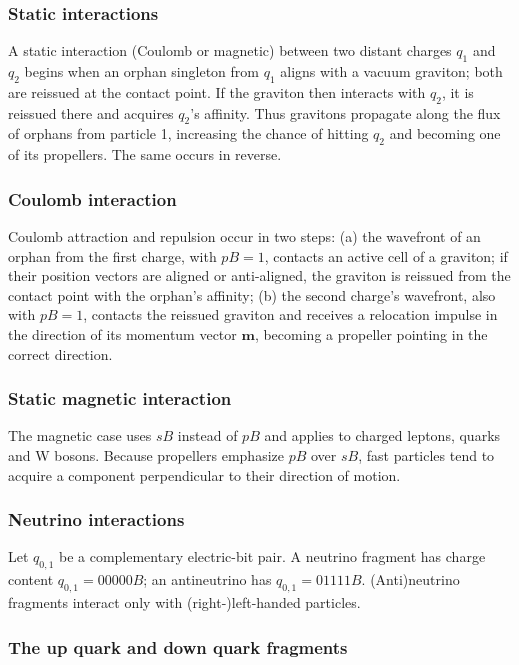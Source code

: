\documentclass{ijuc}
\begin{document}
\subsubsection{Static interactions}

A static interaction (Coulomb or magnetic) between two distant charges $q_1$ and $q_2$ begins when an orphan singleton from $q_1$ aligns with a vacuum graviton; both are reissued at the contact point. If the graviton then interacts with $q_2$, it is reissued there and acquires $q_2$'s affinity. Thus gravitons propagate along the flux of orphans from particle 1, increasing the chance of hitting $q_2$ and becoming one of its propellers. The same occurs in reverse.

\subsubsection{Coulomb interaction} \label{subsec:Coulomb-interaction}

Coulomb attraction and repulsion occur in two steps: (a) the wavefront of an orphan from the first charge, with $pB=1$, contacts an active cell of a graviton; if their position vectors are aligned or anti-aligned, the graviton is reissued from the contact point with the orphan's affinity; (b) the second charge's wavefront, also with $pB=1$, contacts the reissued graviton and receives a relocation impulse in the direction of its momentum vector $\boldsymbol{m}$, becoming a propeller pointing in the correct direction.

\subsubsection{Static magnetic interaction}

The magnetic case uses $sB$ instead of $pB$ and applies to charged leptons, quarks and W bosons. Because propellers emphasize $pB$ over $sB$, fast particles tend to acquire a component perpendicular to their direction of motion.

\subsubsection{Neutrino interactions}

Let $q_{0,1}$ be a complementary electric-bit pair. A neutrino fragment has charge content $q_{0,1}=00000B$; an antineutrino has $q_{0,1}=01111B$. (Anti)neutrino fragments interact only with (right-)left-handed particles.

\subsubsection{The up quark and down quark fragments}
\end{document}
